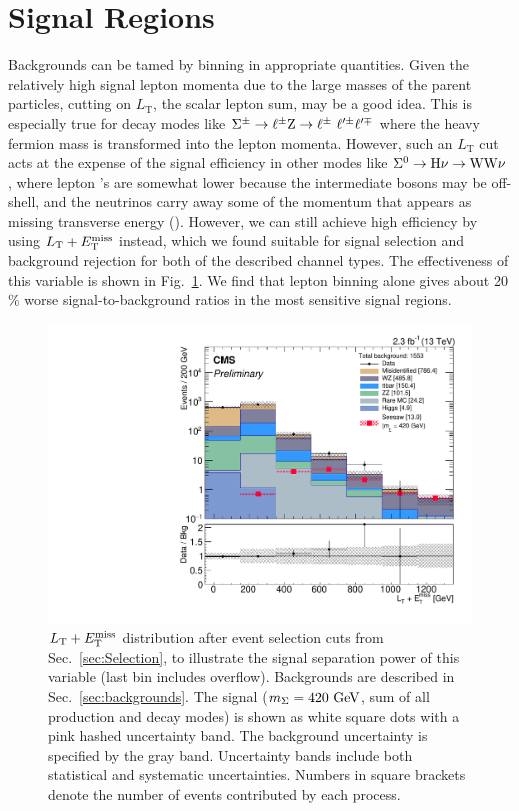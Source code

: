 \section{Signal Regions}
\label{sec:Optimization}


Backgrounds can be tamed by binning in appropriate quantities. Given the relatively high signal lepton momenta due to the large masses of the parent particles, cutting on $L_\textrm{T}$, the scalar lepton \pt sum, may be a good idea. This is especially true for decay modes like $\Sigma^\pm \to \ell^\pm \mathrm{Z} \to \ell^\pm ~ \ell^{\prime \pm} \ell^{\prime \mp}$ where the heavy fermion mass is transformed into the lepton momenta. However, such an $L_\textrm{T}$ cut acts at the expense of the signal efficiency in other modes like $\Sigma^0 \to \mathrm{H} \nu \to \mathrm{W}\mathrm{W}\nu$, where lepton \pt's are somewhat lower because the intermediate bosons may be off-shell, and the neutrinos carry away some of the momentum that appears as missing transverse energy (\MET). However, we can still achieve high efficiency by using $L_\textrm{T} + E_{\mathrm{T}}^{\text{miss}}$ instead, which we found suitable for signal selection and background rejection for both of the described channel types. The effectiveness of this variable is shown in Fig.~\ref{fig:Optimization}. We find that lepton \pt binning alone gives about 20\,\% worse signal-to-background ratios in the most sensitive signal regions.

\begin{figure}
\begin{center}
	\includegraphics[width=.7\textwidth]{Optimization/LT+MET}
	\caption{$L_\textrm{T} + E_{\mathrm{T}}^{\text{miss}}$ distribution after event selection cuts from Sec.~\ref{sec:Selection}, to illustrate the signal separation power of this variable (last bin includes overflow). Backgrounds are described in Sec.~{\ref{sec:backgrounds}}. The signal ($m_\Sigma = 420\,\,\text{Ge\hspace{-.08em}V}$, sum of all production and decay modes) is shown as white square dots with a pink hashed uncertainty band. The background uncertainty is specified by the gray band. Uncertainty bands include both statistical and systematic uncertainties. Numbers in square brackets denote the number of events contributed by each process.
	\label{fig:Optimization}}
\end{center}
\end{figure}

